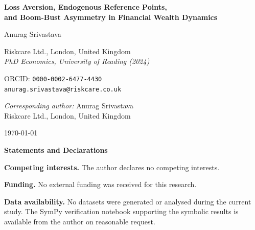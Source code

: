 \documentclass[12pt,a4paper]{article}
\begin{document}
\thispagestyle{empty}

\begin{center}

{\Large\bfseries Loss Aversion, Endogenous Reference Points,\\[6pt]
and Boom-Bust Asymmetry in Financial Wealth Dynamics}

\vspace{1.5cm}

{\large Anurag Srivastava}

\vspace{0.4cm}

Riskcare Ltd., London, United Kingdom\\
\textit{PhD Economics, University of Reading (2024)}

\vspace{0.4cm}

ORCID: \texttt{0000-0002-6477-4430}\\
\texttt{anurag.srivastava@riskcare.co.uk}

\vspace{1.5cm}

\textit{Corresponding author:} Anurag Srivastava\\
Riskcare Ltd., London, United Kingdom

\vspace{1cm}

\today

\vspace{2cm}

\textbf{Statements and Declarations}

\vspace{0.3cm}

\noindent\textbf{Competing interests.}
The author declares no competing interests.

\vspace{0.3cm}

\noindent\textbf{Funding.}
No external funding was received for this research.

\vspace{0.3cm}

\noindent\textbf{Data availability.}
No datasets were generated or analysed during the current study.
The SymPy verification notebook supporting the symbolic results
is available from the author on reasonable request.

\end{center}
\end{document}
